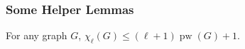 \documentclass[kpfonts]{patmorin}
\DeclareMathOperator{\pw}{pw}
\newcommand{\lrn}{\chi_{\ell}}
\theoremstyle{named}
\begin{document}
%
%

\subsubsection{Some Helper Lemmas}

\begin{lem}\label{pathwidth}
    For any graph $G$, $\lrn(G)\le (\ell+1)\pw(G) + 1$.
\end{lem}
\end{document}
